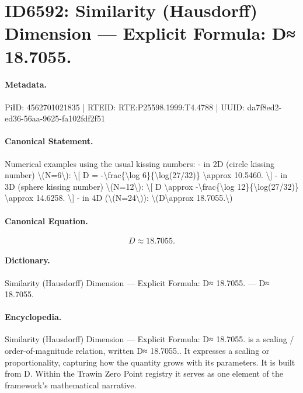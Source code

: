 \section*{ID6592: Similarity (Hausdorff) Dimension — Explicit Formula: D≈ 18.7055.}
\paragraph{Metadata.}
PiID: 4562701021835 | RTEID: RTE:P25598.1999:T4.4788 | UUID: da7f8ed2-ed36-56aa-9625-fa102fdf2f51

\paragraph{Canonical Statement.}
Numerical examples using the usual kissing numbers: - in 2D (circle kissing number) \textbackslash{}(N=6\textbackslash{}): \textbackslash{}[ D = -\textbackslash{}frac\{\textbackslash{}log 6\}\{\textbackslash{}log(27/32)\} \textbackslash{}approx 10.5460. \textbackslash{}] - in 3D (sphere kissing number) \textbackslash{}(N=12\textbackslash{}): \textbackslash{}[ D \textbackslash{}approx -\textbackslash{}frac\{\textbackslash{}log 12\}\{\textbackslash{}log(27/32)\} \textbackslash{}approx 14.6258. \textbackslash{}] - in 4D (\textbackslash{}(N=24\textbackslash{})): \textbackslash{}(D\textbackslash{}approx 18.7055.\textbackslash{})

\paragraph{Canonical Equation.}
\[
D\approx 18.7055.
\]

\paragraph{Dictionary.}
Similarity (Hausdorff) Dimension — Explicit Formula: D≈ 18.7055. — D≈ 18.7055.

\paragraph{Encyclopedia.}
Similarity (Hausdorff) Dimension — Explicit Formula: D≈ 18.7055. is a scaling / order-of-magnitude relation, written D≈ 18.7055.. It expresses a scaling or proportionality, capturing how the quantity grows with its parameters. It is built from D. Within the Trawin Zero Point registry it serves as one element of the framework's mathematical narrative.
